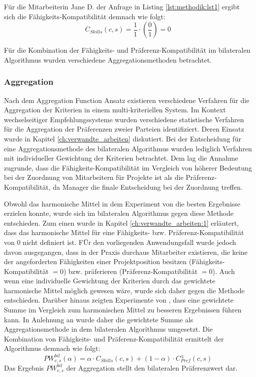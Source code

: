 Für die Mitarbeiterin Jane D. der Anfrage in Listing \ref{lst:methodik:lst1} ergibt sich die Fähigkeits-Kompatibilität demnach wie folgt:
\begin{equation}\label{methodik:eq:5}
    C_{Skills}(c,s) = \frac{1}{1} \cdot (\frac{0}{1}) = 0
\end{equation}

Für die Kombination der Fähigkeits- und Präferenz-Kompatibilität im bilateralen Algorithmus wurden verschiedene Aggregationsmethoden betrachtet.

\subsubsection{Aggregation}
Nach dem Aggregation Function Ansatz existieren verschiedene Verfahren für die Aggregation der Kriterien in einem multi-kriteriellen System.
Im Kontext wechselseitiger Empfehlungssysteme wurden verschiedene statistische Verfahren für die Aggregation der Präferenzen zweier Parteien identifiziert.
Deren Einsatz wurde in Kapitel \ref{ch:verwandte_arbeiten} diskutiert.
Bei der Entscheidung für eine Aggregationsmethode des bilateralen Algorithmus wurden lediglich Verfahren mit individueller Gewichtung der Kriterien betrachtet.
Dem lag die Annahme zugrunde, dass die Fähigkeits-Kompatibilität im Vergleich von höherer Bedeutung bei der Zuordnung von Mitarbeitern für Projekte ist als die Präferenz-Kompatibilität, da Manager die finale Entscheidung bei der Zuordnung treffen.

Obwohl das harmonische Mittel in dem Experiment von \textcite[S. 1ff.]{kumari:2:inproceedings} die besten Ergebnisse erzielen konnte, wurde sich im bilateralen Algorithmus gegen diese Methode entschieden.
Zum einen wurde in Kapitel \ref{ch:verwandte_arbeiten:1} erläutert, dass das harmonische Mittel für eine Fähigkeits- bzw. Präferenz-Kompatibilität von 0 nicht definiert ist.
FÜr den vorliegenden Anwendungsfall wurde jedoch davon ausgegangen, dass in der Praxis durchaus Mitarbeiter existieren, die keine der angeforderten Fähigkeiten einer Projektposition besitzen (Fähigkeits-Kompatibilität $= 0$) bzw. präferieren (Präferenz-Kompatibilität $= 0$).
Auch wenn eine individuelle Gewichtung der Kriterien durch das gewichtete harmonische Mittel möglich gewesen wäre, wurde sich daher gegen die Methode entschieden.
Darüber hinaus zeigten Experimente von \textcite[S. 131ff.]{kleinerman:2:inproceedings}, dass eine gewichtete Summe im Vergleich zum harmonischen Mittel zu besseren Ergebnissen führen kann.
In Anlehnung an \textcite[S. 131ff.]{kleinerman:2:inproceedings} wurde daher die gewichtete Summe als Aggregationsmethode in dem bilateralen Algorithmus umgesetzt.
Die Kombination von Fähigkeits- und Präferenz-Kompatibilität ermittelt der Algorithmus demnach wie folgt:
\begin{equation}\label{methodik:eq:6}
    PW_{c,s}^{bil}(\alpha) = \alpha \cdot C_{Skills}(c,s) + (1-\alpha) \cdot C_{Pref}^{\pm}(c,s)
\end{equation}
Das Ergebnis $PW_{c,s}^{bil}$ der Aggregation stellt den bilateralen Präferenzwert dar.

